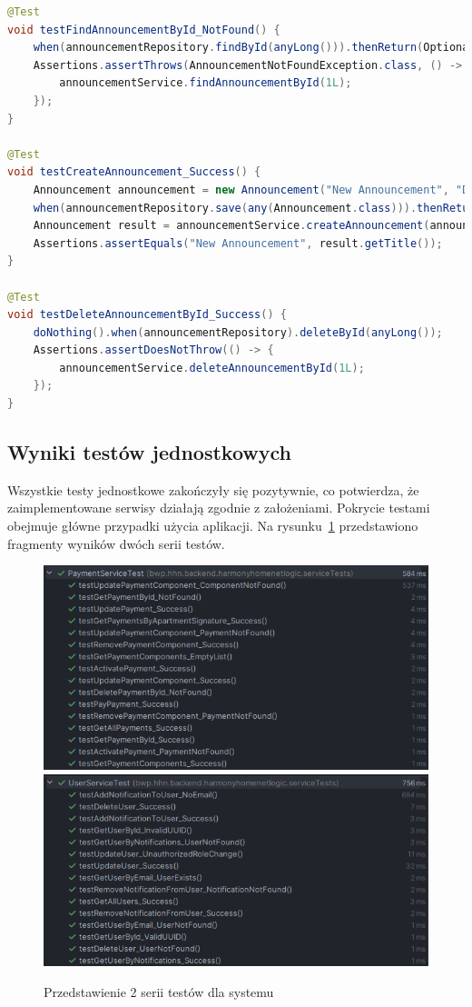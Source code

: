 \begin{lstlisting}[language=Java, style=JavaStyle, caption= Przykłądowe testy dla \texttt{AnnouncementService}]
@Test
void testFindAnnouncementById_NotFound() {
    when(announcementRepository.findById(anyLong())).thenReturn(Optional.empty());
    Assertions.assertThrows(AnnouncementNotFoundException.class, () -> {
        announcementService.findAnnouncementById(1L);
    });
}

@Test
void testCreateAnnouncement_Success() {
    Announcement announcement = new Announcement("New Announcement", "Description");
    when(announcementRepository.save(any(Announcement.class))).thenReturn(announcement);
    Announcement result = announcementService.createAnnouncement(announcement);
    Assertions.assertEquals("New Announcement", result.getTitle());
}

@Test
void testDeleteAnnouncementById_Success() {
    doNothing().when(announcementRepository).deleteById(anyLong());
    Assertions.assertDoesNotThrow(() -> {
        announcementService.deleteAnnouncementById(1L);
    });
}
\end{lstlisting}



\subsection{Wyniki testów jednostkowych}
Wszystkie testy jednostkowe zakończyły się pozytywnie, co potwierdza, że zaimplementowane serwisy działają zgodnie z założeniami. Pokrycie testami obejmuje główne przypadki użycia aplikacji. Na rysunku~\ref{fig:test_presetation} przedstawiono fragmenty wyników dwóch serii testów.

\begin{figure}[htb]
	\centering
		\includegraphics[width=0.91\linewidth]{rys03/testy/platnosci_testy} 
		\\
		\includegraphics[width=0.91\linewidth]{rys03/testy/user_testy} 
		\caption{Przedstawienie 2 serii testów dla systemu}
	\label{fig:test_presetation}
\end{figure}

